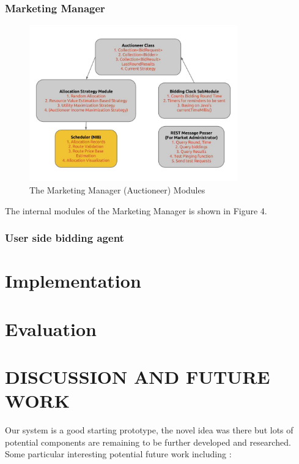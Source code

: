 \documentclass[a4paper,11pt,twocolumn]{article}
\begin{document}
\subsubsection{Marketing Manager}

\begin{figure}[ht!]
\centering
\includegraphics[width=90mm]{core.jpg}
\caption{The Marketing Manager (Auctioneer) Modules}
\label{overflow}
\end{figure}

The internal modules of the Marketing Manager is shown in Figure 4.

\subsubsection{User side bidding agent}



\section{Implementation}


\section{Evaluation}

\section{DISCUSSION AND FUTURE WORK}

Our system is a good starting prototype, the novel idea was there but lots of potential components are remaining to be 
further developed and researched. Some particular interesting potential future work including :
\end{document}
